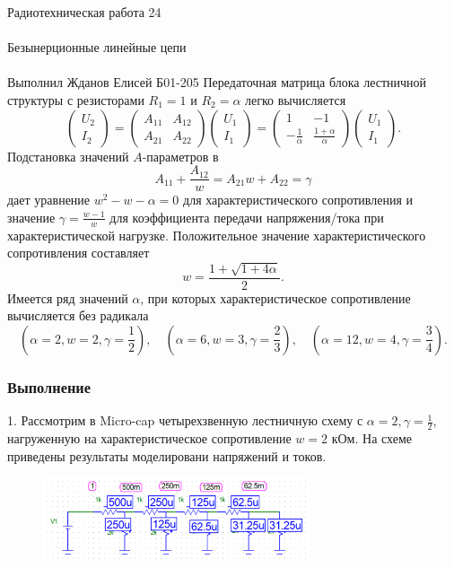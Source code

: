 \documentclass{astroedu-lab}
\begin{document}
\begin{problem}{\huge Радиотехническая работа 24\\\\Безынерционные линейные цепи\\\\Выполнил Жданов Елисей Б01-205}
Передаточная матрица блока лестничной структуры с резисторами $R_1=1$ и $R_2=\alpha$ легко вычисляется
$$
\left(\begin{array}{c}
U_2 \\
I_2
\end{array}\right)=\left(\begin{array}{ll}
A_{11} & A_{12} \\
A_{21} & A_{22}
\end{array}\right)\left(\begin{array}{c}
U_1 \\
I_1
\end{array}\right)=\left(\begin{array}{cc}
1 & -1 \\
-\frac{1}{\alpha} & \frac{1+\alpha}{\alpha}
\end{array}\right)\left(\begin{array}{c}
U_1 \\
I_1
\end{array}\right) .
$$
Подстановка значений $A$-параметров в
$$
A_{11}+\frac{A_{12}}{w}=A_{21} w+A_{22}=\gamma
$$
дает уравнение $w^2-w-\alpha=0$ для характеристического сопротивления и значение $\gamma=\frac{w-1}{w}$ для коэффициента передачи напряжения/тока при характеристической нагрузке. Положительное значение характеристического сопротивления составляет
$$
w=\frac{1+\sqrt{1+4 \alpha}}{2} .
$$
Имеется ряд значений $\alpha$, при которых характеристическое сопротивление вычисляется без радикала
$$
\left(\alpha=2, w=2, \gamma=\frac{1}{2}\right), \quad\left(\alpha=6, w=3, \gamma=\frac{2}{3}\right), \quad\left(\alpha=12, w=4, \gamma=\frac{3}{4}\right) .
$$

\newpage

\subsubsection{Выполнение}

1. Рассмотрим в Micro-cap четырехзвенную лестничную схему с $\alpha=2, \gamma=\frac{1}{2}$, нагруженную на характеристическое сопротивление $w=2$ кОм. На схеме приведены результаты моделировани напряжений и токов.

\begin{figure}[!h]
	\centering
	\includegraphics[width=0.7\textwidth]{19a.png}
	\label{fig:boiler}
\end{figure}


\end{problem}
\end{document}
